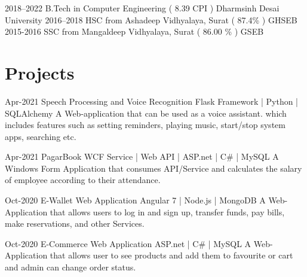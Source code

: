 \documentclass[]{cv-style}
\begin{document}
\begin{entrylist}
\entry
{2018--2022}
{B.Tech {\normalfont in Computer Engineering ( 8.39 CPI )}}
{Dharmsinh Desai University}
{\vspace{-0.3cm}}
\entry
{2016--2018}
{HSC {\normalfont from Ashadeep Vidhyalaya, Surat ( 87.4\% )}}
{GHSEB}
{\vspace{-0.3cm}}
\entry
{2015-2016}
{SSC {\normalfont from Mangaldeep Vidhyalaya, Surat ( 86.00 \% )}}
{GSEB}
{}

\end{entrylist}


\section{Projects}

\begin{entrylist}
\entry
{Apr-2021}
{Speech Processing and Voice Recognition}
{Flask Framework | Python | SQLAlchemy}
{A Web-application that can be used as a voice assistant. which includes features such as setting reminders, playing music, start/stop system apps, searching etc.}
{\vspace{-0.3cm}}
\end{entrylist}

\begin{entrylist}
\entry
{Apr-2021}
{PagarBook}
{WCF Service | Web API | ASP.net | C\# | MySQL }
{A Windows Form Application that consumes API/Service and calculates the salary of employee according to their attendance. }
{\vspace{-0.3cm}}

\end{entrylist}

\begin{entrylist}
\entry
{Oct-2020}
{E-Wallet Web Application}
{Angular 7 | Node.js | MongoDB }
{A Web-Application that allows users to log in and sign up, transfer funds, pay bills, make reservations, and other Services. }
{\vspace{-0.3cm}}
\end{entrylist}
\begin{entrylist}
\entry
{Oct-2020}
{E-Commerce Web Application}
{ASP.net | C\# | MySQL }
{A Web-Application that allows user to see products and add them to favourite or cart and admin can change order status.}
{\vspace{-0.3cm}}


\end{entrylist}
\end{document}
